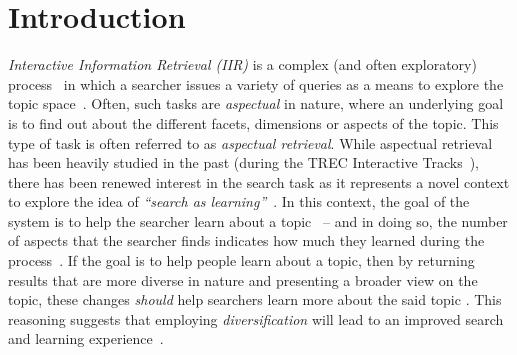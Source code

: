 \section{Introduction} \label{sec:intro}
\emph{Interactive Information Retrieval (IIR)} is a complex (and often exploratory) process~\cite{ingwersen2005theturn} in which a searcher issues a variety of queries as a means to explore the topic space~\cite{kelly2015search_tasks}. Often, such tasks are \emph{aspectual} in nature, where an underlying goal is to find out about the different facets, dimensions or aspects of the topic. This type of task is often referred to as \emph{aspectual retrieval}. While aspectual retrieval has been heavily studied in the past (during the TREC Interactive Tracks~\cite{over2001trec}), there has been renewed interest in the search task as it represents a novel context to explore the idea of \emph{``search as learning''}~\cite{collins2017sal}. In this context, the goal of the system is to help the searcher learn about a topic~\cite{collins2017sal} -- and in doing so, the number of aspects that the searcher finds indicates how much they learned during the process~\cite{syed2017sal}. If the goal is to help people learn about a topic, then by returning results that are more diverse in nature and presenting a broader view on the topic, these changes \emph{should} help searchers learn more about the said topic . This reasoning suggests that employing \emph{diversification} will lead to an improved search and learning experience~\cite{syed2017sal}. 

